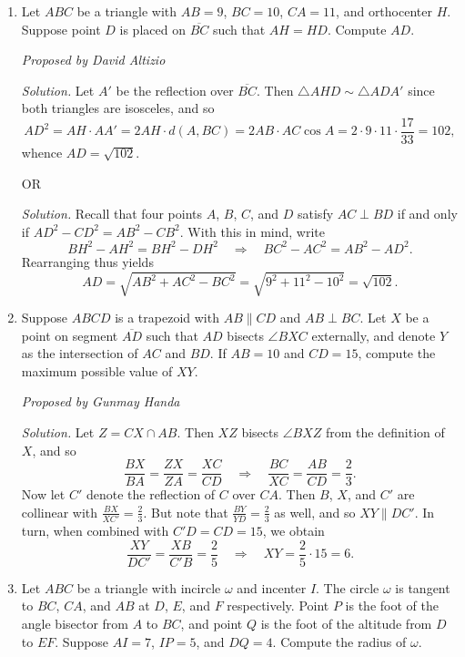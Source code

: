 \documentclass[10pt]{article}
\newcommand{\proposed}[1]
{
\vspace{3pt}
\noindent\textit{Proposed by #1}
}
\newcommand{\solution}
{
\vspace{3pt}
\noindent\textit{Solution.}\qquad
}
\begin{document}
\begin{enumerate}

\item Let $ABC$ be a triangle with $AB=9$, $BC=10$, $CA=11$, and orthocenter $H$.  Suppose point $D$ is placed on $\overline{BC}$ such that $AH=HD$.  Compute $AD$.

\proposed{David Altizio}

\solution Let $A'$ be the reflection over $\overline{BC}$.  Then $\triangle AHD\sim\triangle ADA'$ since both triangles are isosceles, and so \[AD^2 = AH\cdot AA' = 2AH\cdot d(A,BC) = 2AB\cdot AC\cos A = 2\cdot 9\cdot 11\cdot\frac{17}{33} = 102,\] whence $AD=\boxed{\sqrt{102}}$.

\begin{center}OR\end{center}

\solution Recall that four points $A$, $B$, $C$, and $D$ satisfy $AC\perp BD$ if and only if $AD^2 - CD^2 = AB^2 - CB^2$.  With this in mind, write \[BH^2 - AH^2 = BH^2 - DH^2\quad\Rightarrow\quad BC^2 - AC^2 = AB^2 - AD^2.\] Rearranging thus yields \[AD = \sqrt{AB^2+AC^2-BC^2} = \sqrt{9^2+11^2-10^2} = \boxed{\sqrt{102}}.\]

\item Suppose $ABCD$ is a trapezoid with $AB\parallel CD$ and $AB\perp BC$. Let $X$ be a point on segment $\overline{AD}$ such that $AD$ bisects $\angle BXC$ externally, and denote $Y$ as the intersection of $AC$ and $BD$. If $AB=10$ and $CD=15$, compute the maximum possible value of $XY$.

\proposed{Gunmay Handa}

\solution Let $Z=CX\cap AB$.  Then $XZ$ bisects $\angle BXZ$ from the definition of $X$, and so \[\frac{BX}{BA} = \frac{ZX}{ZA} = \frac{XC}{CD}\quad\Rightarrow\quad \frac{BC}{XC} = \frac{AB}{CD} = \frac23.\] Now let $C'$ denote the reflection of $C$ over $CA$.  Then $B$, $X$, and $C'$ are collinear with $\frac{BX}{XC'} = \frac23$.  But note that $\frac{BY}{YD} = \frac23$ as well, and so $XY\parallel DC'$.  In turn, when combined with $C'D = CD = 15$, we obtain \[\frac{XY}{DC'} = \frac{XB}{C'B} = \frac25\quad\Rightarrow\quad XY = \frac25\cdot 15 = 6.\]

\item Let $ABC$ be a triangle with incircle $\omega$ and incenter $I$.  The circle $\omega$ is tangent to $BC$, $CA$, and $AB$ at $D$, $E$, and $F$ respectively.  Point $P$ is the foot of the angle bisector from $A$ to $BC$, and point $Q$ is the foot of the altitude from $D$ to $EF$. Suppose $AI=7$, $IP=5$, and $DQ=4$.  Compute the radius of $\omega$.


\end{enumerate}
\end{document}
